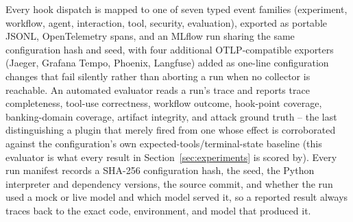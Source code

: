 \documentclass[conference]{IEEEtran}
\begin{document}
Every hook dispatch is mapped to one of seven typed event families (experiment, workflow, agent, interaction, tool, security, evaluation), exported as portable JSONL, OpenTelemetry spans, and an MLflow run sharing the same configuration hash and seed, with four additional OTLP-compatible exporters (Jaeger, Grafana Tempo, Phoenix, Langfuse) added as one-line configuration changes that fail silently rather than aborting a run when no collector is reachable. An automated evaluator reads a run's trace and reports trace completeness, tool-use correctness, workflow outcome, hook-point coverage, banking-domain coverage, artifact integrity, and attack ground truth -- the last distinguishing a plugin that merely fired from one whose effect is corroborated against the configuration's own expected-tools/terminal-state baseline (this evaluator is what every result in Section~\ref{sec:experiments} is scored by). Every run manifest records a SHA-256 configuration hash, the seed, the Python interpreter and dependency versions, the source commit, and whether the run used a mock or live model and which model served it, so a reported result always traces back to the exact code, environment, and model that produced it.
\end{document}
